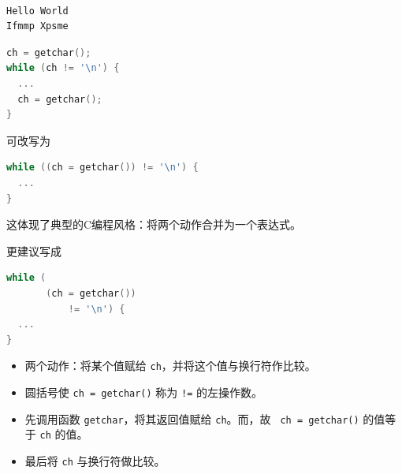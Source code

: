 \begin{frame}[fragile]
  \begin{minipage}{0.65\textwidth}
    
  \end{minipage}~~~\pause 
  \begin{minipage}{0.3\textwidth}
\begin{lstlisting}[backgroundcolor=\color{blue!20}]
Hello World
Ifmmp Xpsme
\end{lstlisting}    
  \end{minipage}

\end{frame}


\begin{frame}[fragile]
\begin{lstlisting}[language=c,frame=single]
ch = getchar();
while (ch != '\n') {
  ...
  ch = getchar();
}
\end{lstlisting} 
可改写为
\begin{lstlisting}[language=c,frame=single]
while ((ch = getchar()) != '\n') {
  ...   
}
\end{lstlisting} \pause \vspace{0.1in}

这体现了典型的C编程风格：将两个动作合并为一个表达式。
\end{frame}

\begin{frame}[fragile]
更建议写成
\begin{lstlisting}[language=c,frame=single]
while (
       (ch = getchar()) 
           != '\n') {
  ...   
}
\end{lstlisting}
\end{frame}

\begin{frame}[fragile]

\begin{itemize}
\item 两个动作：将某个值赋给 \lstinline|ch|，并将这个值与换行符作比较。\\[0.1in]
\item 圆括号使 \lstinline|ch = getchar()| 称为 \lstinline|!=| 的左操作数。\\[0.1in]
\item 先调用函数 \lstinline|getchar|，将其返回值赋给 \lstinline|ch|。而，故 \lstinline| ch = getchar()| 的值等于 \lstinline|ch| 的值。\\[0.1in]
\item 最后将 \lstinline|ch| 与换行符做比较。
\end{itemize}
\end{frame}

